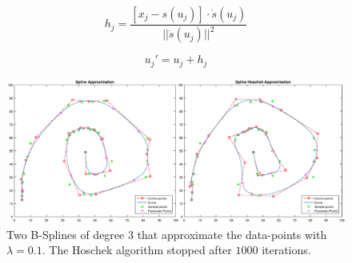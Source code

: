 \documentclass[12pt,a4paper]{article}
\begin{document}
\begin{equation}
h_j = \frac{[x_j - s(u_j)]\cdot\dot{s}(u_j)}{||\dot{s}(u_j)||^2}
\end{equation}

\begin{equation}
u_j' = u_j + h_j
\end{equation}

\begin{figure}[hbtp]
\centering
\includegraphics[width=\textwidth]{SplineApproximation.eps}
\caption{Two B-Splines of degree $3$ that approximate the data-points with $\lambda = 0.1$. The Hoschek algorithm stopped after $1000$ iterations.}
\label{fig:splineApprox}
\end{figure}
\end{document}
